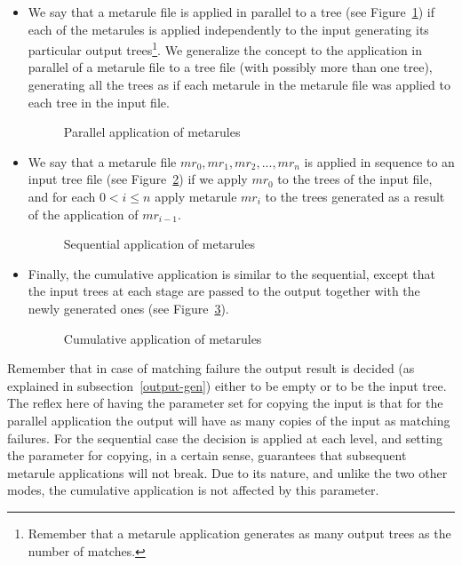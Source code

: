 \begin{itemize}
\item We say that a metarule file is applied in parallel to a tree 
(see Figure~\ref{parallel})
if each of the 
metarules is applied independently to the input generating its particular 
output trees\footnote{Remember that a metarule application generates as many 
output trees as the number of matches.}. We generalize the concept to the
application in parallel of a metarule file to a tree file (with possibly more 
than one tree), generating all the trees
as if each metarule in the metarule file was applied to each tree in the
input file.

\begin{figure}[htb]
\centerline{}
\caption{Parallel application of metarules}
\label{parallel}
\end{figure}

\item We say that a metarule file $mr_0, mr_1, mr_2, ...,mr_n$ is applied in 
sequence to an input tree file 
(see Figure~\ref{sequential})
if we apply $mr_0$ to the trees of the input file, and
for each $0<i\leq n$ apply metarule $mr_i$ to the trees generated as a 
result of the application of $mr_{i-1}$.

\begin{figure}[htb]
\centerline{}
\caption{Sequential application of metarules}
\label{sequential}
\end{figure}

\item Finally, the cumulative application is similar to the sequential, 
except that the input trees at each stage are passed to the output together
with the newly generated ones (see Figure~\ref{cumulative}).

\begin{figure}[htb]
\centerline{}
\caption{Cumulative application of metarules}
\label{cumulative}
\end{figure}

\end{itemize}

Remember that in case of matching failure the output result is decided (as 
explained in subsection~\ref{output-gen}) either to be empty or to be the 
input tree. The reflex here of having the parameter set for copying the input
is that for the parallel application the output will have as many copies of
the input as matching failures. For the sequential case the decision is applied
at each level, and setting the parameter for copying, in a certain sense, 
guarantees that subsequent metarule applications will not break.
Due to its nature, and unlike the two other modes, the cumulative 
application is not affected by this parameter.

